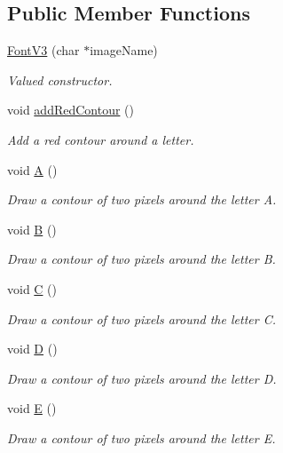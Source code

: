 \subsection*{Public Member Functions}
\begin{DoxyCompactItemize}
\item 
\mbox{\hyperlink{class_font_v3_a17489efd8fdb93bb48e5fcf22c2660c3}{Font\+V3}} (char $\ast$image\+Name)
\begin{DoxyCompactList}\small\item\em Valued constructor. \end{DoxyCompactList}\item 
void \mbox{\hyperlink{class_font_v3_a639f1eac0eb6724463813270f47e2696}{add\+Red\+Contour}} ()
\begin{DoxyCompactList}\small\item\em Add a red contour around a letter. \end{DoxyCompactList}\item 
void \mbox{\hyperlink{class_font_v3_a41289cee13f84a1f9b9d893dfb4be5d4}{A}} ()
\begin{DoxyCompactList}\small\item\em Draw a contour of two pixels around the letter A. \end{DoxyCompactList}\item 
void \mbox{\hyperlink{class_font_v3_aa6528f56e5354e83f610dbf821b62889}{B}} ()
\begin{DoxyCompactList}\small\item\em Draw a contour of two pixels around the letter B. \end{DoxyCompactList}\item 
void \mbox{\hyperlink{class_font_v3_ada061c6a902b960bcfc04dbe37a1bee5}{C}} ()
\begin{DoxyCompactList}\small\item\em Draw a contour of two pixels around the letter C. \end{DoxyCompactList}\item 
void \mbox{\hyperlink{class_font_v3_aee01b6c22df5dfaaa48141fe78844087}{D}} ()
\begin{DoxyCompactList}\small\item\em Draw a contour of two pixels around the letter D. \end{DoxyCompactList}\item 
void \mbox{\hyperlink{class_font_v3_adf947a3aded58ead448368adc0628b16}{E}} ()
\begin{DoxyCompactList}\small\item\em Draw a contour of two pixels around the letter E. \end{DoxyCompactList}\item 

\end{DoxyCompactItemize}
